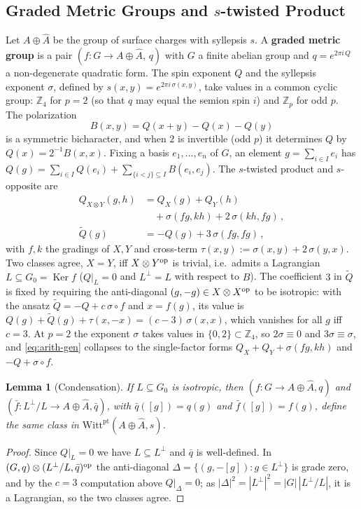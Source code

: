 \documentclass[aps,twocolumn,prx,floatfix,preprintnumbers, nofootinbib,10pt]{revtex4-2}
\numberwithin{equation}{section}
\newtheorem{lemma}[theorem]{Lemma}
\theoremstyle{definition}
\theoremstyle{remark}
\theoremstyle{claim}
\newcommand{\be}{\begin{equation}}
\newcommand{\ee}{\end{equation}}
\newcommand{\ba}{\begin{aligned}}
\newcommand{\ea}{\end{aligned}}
\renewcommand{\ker}{\operatorname{Ker}}
\newcommand{\Z}{{\mathbb Z}}
\newcommand{\Witt}{\text{Witt}}
\newcommand{\pt}{\text{pt}}
\begin{document}
\subsection{Graded Metric Groups and  $s$-twisted Product}
\label{app:framework}



Let $A\oplus\widehat A$ be the group of surface charges with syllepsis $s$.  A
{\bf graded metric group} is a pair $(f:G\to A\oplus\widehat A,\,q)$ with $G$ a
finite abelian group and $q=e^{2\pi i\,Q}$ a non-degenerate quadratic form.  The
spin exponent $Q$ and the syllepsis exponent $\sigma$, defined by
$s(x,y)=e^{2\pi i\,\sigma(x,y)}$, take values in a common cyclic group: $\Z_4$
for $p=2$ (so that $q$ may equal the semion spin $i$) and $\Z_p$ for odd
$p$.  The polarization
\be\label{eq:polgen}
  B(x,y)=Q(x+y)-Q(x)-Q(y)
\ee
is a symmetric bicharacter, and when $2$ is invertible (odd $p$) it determines
$Q$ by $Q(x)=2^{-1}B(x,x)$.  Fixing a basis $e_1,\dots,e_n$ of $G$, an element
$g=\sum_{i\in I}e_i$ has $Q(g)=\sum_{i\in I}Q(e_i)+\sum_{\{i<j\}\subseteq I}B(e_i,e_j)$.
The $s$-twisted product and $s$-opposite are
\be\label{eq:arith-gen}
\ba
  Q_{X\otimes Y}(g,h)&=Q_X(g)+Q_Y(h)\\
  &\quad+\sigma(fg,kh)+2\,\sigma(kh,fg)\,,\\
  \widetilde Q(g)&=-Q(g)+3\,\sigma(fg,fg)\,,
\ea
\ee
with $f,k$ the gradings of $X,Y$ and cross-term
$\tau(x,y):=\sigma(x,y)+2\,\sigma(y,x)$.  Two classes agree, $X=Y$, iff
$X\otimes Y^{\rm op}$ is trivial, i.e.\ admits a Lagrangian $L\subseteq G_0=\ker f$
($Q|_L=0$ and $L^\perp=L$ with respect to $B$).  The coefficient $3$ in
$\widetilde Q$ is fixed by requiring the anti-diagonal $(g,-g)\in X\otimes X^{\rm op}$
to be isotropic: with the ansatz $\widetilde Q=-Q+c\,\sigma\circ f$ and $x=f(g)$,
its value is $Q(g)+\widetilde Q(g)+\tau(x,-x)=(c-3)\,\sigma(x,x)$, which vanishes
for all $g$ iff $c=3$.  At $p=2$ the exponent $\sigma$ takes values in
$\{0,2\}\subset\Z_4$, so $2\sigma\equiv0$ and $3\sigma\equiv\sigma$, and
\eqref{eq:arith-gen} collapses to the single-factor forms $Q_X+Q_Y+\sigma(fg,kh)$
and $-Q+\sigma\circ f$.

\begin{lemma}[Condensation]\label{lem:cond}
If $L\subseteq G_0$ is isotropic, then $(f:G\to A\oplus\widehat A,q)$ and
$(\bar f:L^\perp/L\to A\oplus\widehat A,\bar q)$, with $\bar q([g])=q(g)$ and
$\bar f([g])=f(g)$, define the same class in $\Witt^\pt(A\oplus\widehat A,s)$.
\end{lemma}
\begin{proof}
Since $Q|_L=0$ we have $L\subseteq L^\perp$ and $\bar q$ is well-defined.  In
$(G,q)\otimes(L^\perp/L,\bar q)^{\rm op}$ the anti-diagonal
$\Delta=\{(g,-[g]):g\in L^\perp\}$ is grade zero, and by the $c=3$ computation
above $Q|_\Delta=0$; as $|\Delta|^2=|L^\perp|^2=|G|\,|L^\perp/L|$, it is a
Lagrangian, so the two classes agree.
\end{proof}
\end{document}
